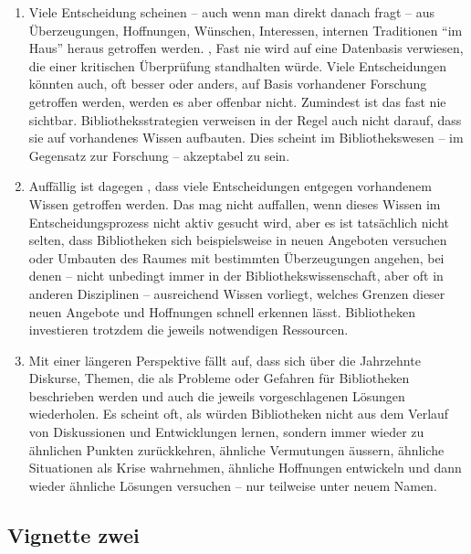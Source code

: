 \documentclass[a4paper,
fontsize=11pt,
oneside,
numbers=noperiodatend,
parskip=half-,
bibliography=totoc,
final
]{scrartcl}
\begin{document}
\begin{enumerate}
\def\labelenumi{(\arabic{enumi})}
\item
  Viele Entscheidung scheinen -- auch wenn man direkt danach fragt --
  aus Überzeugungen, Hoffnungen, Wünschen, Interessen, internen
  Traditionen \enquote{im Haus} heraus getroffen werden. , Fast nie wird
  auf eine Datenbasis verwiesen, die einer kritischen Überprüfung
  standhalten würde. Viele Entscheidungen könnten auch, oft besser oder
  anders, auf Basis vorhandener Forschung getroffen werden, werden es
  aber offenbar nicht. Zumindest ist das fast nie sichtbar.
  Bibliotheksstrategien verweisen in der Regel auch nicht darauf, dass
  sie auf vorhandenes Wissen aufbauten. Dies scheint im Bibliothekswesen
  -- im Gegensatz zur Forschung -- akzeptabel zu sein.
\item
  Auffällig ist dagegen , dass viele Entscheidungen entgegen vorhandenem
  Wissen getroffen werden. Das mag nicht auffallen, wenn dieses Wissen
  im Entscheidungsprozess nicht aktiv gesucht wird, aber es ist
  tatsächlich nicht selten, dass Bibliotheken sich beispielsweise in
  neuen Angeboten versuchen oder Umbauten des Raumes mit bestimmten
  Überzeugungen angehen, bei denen -- nicht unbedingt immer in der
  Bibliothekswissenschaft, aber oft in anderen Disziplinen --
  ausreichend Wissen vorliegt, welches Grenzen dieser neuen Angebote und
  Hoffnungen schnell erkennen lässt. Bibliotheken investieren trotzdem
  die jeweils notwendigen Ressourcen.
\item
  Mit einer längeren Perspektive fällt auf, dass sich über die
  Jahrzehnte Diskurse, Themen, die als Probleme oder Gefahren für
  Bibliotheken beschrieben werden und auch die jeweils vorgeschlagenen
  Lösungen wiederholen. Es scheint oft, als würden Bibliotheken nicht
  aus dem Verlauf von Diskussionen und Entwicklungen lernen, sondern
  immer wieder zu ähnlichen Punkten zurückkehren, ähnliche Vermutungen
  äussern, ähnliche Situationen als Krise wahrnehmen, ähnliche
  Hoffnungen entwickeln und dann wieder ähnliche Lösungen versuchen --
  nur teilweise unter neuem Namen.
\end{enumerate}

\hypertarget{vignette-zwei}{%
\subsection{Vignette zwei}\label{vignette-zwei}}
\end{document}

